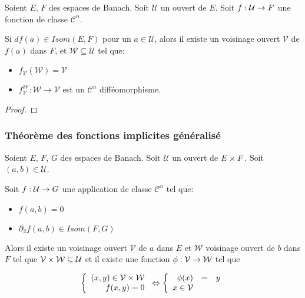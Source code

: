 \begin{theorem}
	Soient $E$, $F$ des espaces de Banach. Soit $\mathcal{U}$ un ouvert de $E$.
	Soit $f : \mathcal{U} \rightarrow F$ une fonction de classe
	$\mathcal{C}^{n}$.

	Si $df(a) \in Isom(E, F)$ pour un $a \in \mathcal{U}$, alors il existe un
	voisinage ouvert $\mathcal{V}$ de $f(a)$ dans $F$, et $\mathcal{W} \subseteq
	\mathcal{U}$ tel que:

	\begin{itemize}
		\item $f_{\mathcal{V}}(\mathcal{W}) = \mathcal{V}$
		\item $f_{\mathcal{V}}^{\mathcal{W}} : \mathcal{W} \rightarrow
			\mathcal{V}$ est un $\mathcal{C}^{n}$ difféomorphisme.
	\end{itemize}
\end{theorem}

\begin{proof}

\end{proof}

\subsubsection{Théorème des fonctions implicites généralisé}

\begin{theorem}
	Soient $E$, $F$, $G$ des espaces de Banach.
	Soit $\mathcal{U}$ un ouvert de $E \times F$.
	Soit $(a, b) \in \mathcal{U}$.

	Soit $f : \mathcal{U} \rightarrow G$ une application de classe
	$\mathcal{C}^{n}$ tel que:

	\begin{itemize}
		\item $f(a, b) = 0$
		\item $\partial_{2}f (a, b) \in Isom(F, G)$
	\end{itemize}

	Alors il existe un voisinage ouvert $\mathcal{V}$ de $a$ dans $E$ et
	$\mathcal{W}$ voisinage ouvert de $b$ dans $F$ tel que $\mathcal{V}
	\times \mathcal{W} \subseteq \mathcal{U}$ et il existe une fonction
	$\phi : \mathcal{V} \rightarrow \mathcal{W}$ tel que

	\begin{align*}
	\left\{
		\begin{array}{r c l}
			(x, y) \in \mathcal{V} \times \mathcal{W} \\
			f(x, y) = 0
		\end{array}
	\right.
	\Leftrightarrow
	\left\{
		\begin{array}{r c l}
			\phi(x) &=& y \\
			x \in \mathcal{V}
		\end{array}
	\right.
	\end{align*}
\end{theorem}

